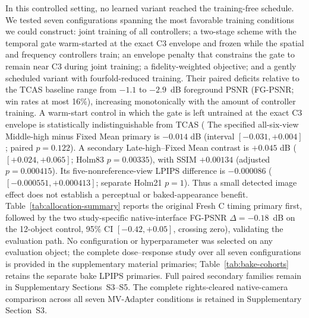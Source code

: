 \documentclass[times,twocolumn,final]{elsarticle}
\providecommand{\DIFadd}[1]{{\protect\color{blue} \sf #1}} %
\providecommand{\DIFdel}[1]{{\protect\color{red} \scriptsize #1}} %
\providecommand{\DIFaddbegin}{} %
\providecommand{\DIFaddend}{} %
\providecommand{\DIFdelbegin}{} %
\providecommand{\DIFdelend}{} %
\begin{document}
\DIFdelbegin \DIFdel{In this controlled setting, no learned variant reached the training-free schedule. We tested seven configurations spanning the most favorable training conditions we could construct: joint training of all controllers; a two-stage scheme with the temporal gate warm-started at the exact C3 envelope and frozen while the spatial and frequency controllers train; an envelope penalty that constrains the gate to remain near C3 during joint training; a fidelity-weighted objective; and a gently scheduled variant with fourfold-reduced training. Their paired deficits relative to the TCAS baseline range from $-1.1$ to $-2.9$~dB foreground PSNR (FG-PSNR; win rates at most 16\%), increasing monotonically with the amount of controller training. A warm-start control in which the gate is left untrained at the exact C3 envelope is statistically indistinguishable from TCAS (}\DIFdelend \DIFaddbegin \DIFadd{The specified all-six-view Middle-high minus Fixed Mean primary is $-0.014$ dB (interval $[-0.031,+0.004]$; }\DIFaddend paired \DIFaddbegin \DIFadd{$p=0.122$). A secondary Late-high--Fixed Mean contrast is $+0.045$ dB ($[+0.024,+0.065]$; Holm83 $p=0.00335$), with SSIM $+0.00134$ (adjusted $p=0.000415$). Its five-nonreference-view LPIPS difference is $-0.000086$ ($[-0.000551,+0.000413]$; separate Holm21 $p=1$). Thus a small detected image effect does not establish a perceptual or baked-appearance benefit. Table~\ref{tab:allocation-summary} reports the original Fresh C timing primary first, followed by the two study-specific native-interface }\DIFaddend FG-PSNR \DIFdelbegin \DIFdel{$\Delta=-0.18$~dB on the 12-object control, 95\% CI $[-0.42,+0.05]$, crossing zero), validating the evaluation path. No configuration or hyperparameter was selected on any evaluation object; the complete dose--response study over all seven configurations is provided in the supplementary material}\DIFdelend \DIFaddbegin \DIFadd{primaries; Table~\ref{tab:bake-cohorts} retains the separate bake LPIPS primaries. Full paired secondary families remain in Supplementary Sections~S3--S5. The complete rights-cleared native-camera comparison across all seven MV-Adapter conditions is retained in Supplementary Section~S3}\DIFaddend .
\end{document}
